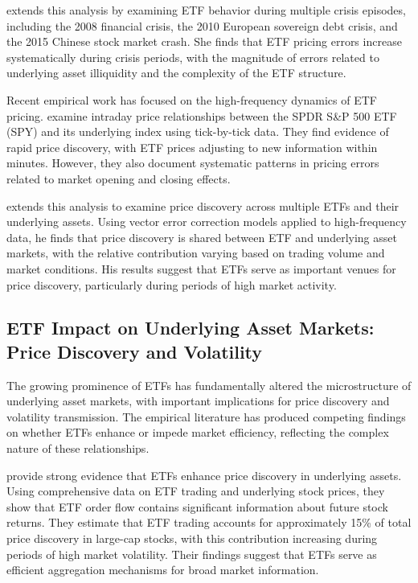 \citet{staer2017asset} extends this analysis by examining ETF behavior during multiple crisis episodes, including the 2008 financial crisis, the 2010 European sovereign debt crisis, and the 2015 Chinese stock market crash. She finds that ETF pricing errors increase systematically during crisis periods, with the magnitude of errors related to underlying asset illiquidity and the complexity of the ETF structure.

Recent empirical work has focused on the high-frequency dynamics of ETF pricing. \citet{richie2008examination} examine intraday price relationships between the SPDR S\&P 500 ETF (SPY) and its underlying index using tick-by-tick data. They find evidence of rapid price discovery, with ETF prices adjusting to new information within minutes. However, they also document systematic patterns in pricing errors related to market opening and closing effects.

\citet{hasbrouck2003intraday} extends this analysis to examine price discovery across multiple ETFs and their underlying assets. Using vector error correction models applied to high-frequency data, he finds that price discovery is shared between ETF and underlying asset markets, with the relative contribution varying based on trading volume and market conditions. His results suggest that ETFs serve as important venues for price discovery, particularly during periods of high market activity.

\subsection{ETF Impact on Underlying Asset Markets: Price Discovery and Volatility}

The growing prominence of ETFs has fundamentally altered the microstructure of underlying asset markets, with important implications for price discovery and volatility transmission. The empirical literature has produced competing findings on whether ETFs enhance or impede market efficiency, reflecting the complex nature of these relationships.

\citet{glosten2021etf} provide strong evidence that ETFs enhance price discovery in underlying assets. Using comprehensive data on ETF trading and underlying stock prices, they show that ETF order flow contains significant information about future stock returns. They estimate that ETF trading accounts for approximately 15\% of total price discovery in large-cap stocks, with this contribution increasing during periods of high market volatility. Their findings suggest that ETFs serve as efficient aggregation mechanisms for broad market information.

